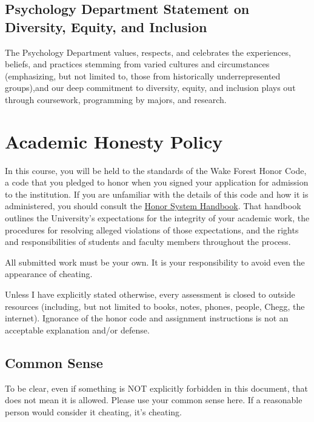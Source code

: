 \documentclass[
]{book}
\begin{document}
\hypertarget{psychology-department-statement-on-diversity-equity-and-inclusion}{%
\section{Psychology Department Statement on Diversity, Equity, and Inclusion}\label{psychology-department-statement-on-diversity-equity-and-inclusion}}

The Psychology Department values, respects, and celebrates the experiences, beliefs, and practices stemming from varied cultures and circumstances (emphasizing, but not limited to, those from historically underrepresented groups),and our deep commitment to diversity, equity, and inclusion plays out through coursework, programming by majors, and research.

\hypertarget{academic-honesty-policy}{%
\chapter{Academic Honesty Policy}\label{academic-honesty-policy}}

In this course, you will be held to the standards of the Wake Forest Honor Code, a code that you pledged to honor when you signed your application for admission to the institution.
If you are unfamiliar with the details of this code and how it is administered, you should consult the \href{https://studentconduct.wfu.edu/honor-system-wfu/}{Honor System Handbook}.
That handbook outlines the University's expectations for the integrity of your academic work, the procedures for resolving alleged violations of those expectations, and the rights and responsibilities of students and faculty members throughout the process.

All submitted work must be your own. It is your responsibility to avoid even the appearance of cheating.

Unless I have explicitly stated otherwise, every assessment is closed to outside resources (including, but not limited to books, notes, phones, people, Chegg, the internet).
Ignorance of the honor code and assignment instructions is not an acceptable explanation and/or defense.

\hypertarget{common-sense}{%
\section{Common Sense}\label{common-sense}}

To be clear, even if something is NOT explicitly forbidden in this document, that does not mean it is allowed. Please use your common sense here. If a reasonable person would consider it cheating, it's cheating.
\end{document}
